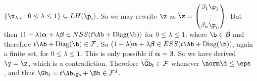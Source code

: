 \documentclass[moor]{informs3}              %
\begin{document}
$\{\x_{\lambda,i}:0\le\lambda\le1\}\subseteq LH(\p_i)$. So we may rewrite $\z$ as $\z=\renewcommand*{\arraystretch}{.5}\begin{pmatrix}\beta_1\p_1 \\ \vdots \\ \beta_n\p_n \end{pmatrix}$.
But then $(1-\lambda)\bm{\alpha}+\lambda\bm{\beta}\in NSS(t\Ab+\textup{Diag}(\b))$ for $0\le\lambda\le1$, where $\b\in\mathcal{\bar B}$ and therefore $t\Ab+\textup{Diag}(\b)\in\mathcal{F}$.
So $(1-\lambda)\bm{\alpha}+\lambda\bm{\beta}\in ESS(t\Ab+\textup{Diag}(\b))$, again a finite set, for $0\le\lambda\le1$. This is only possible if $\bm{\alpha}=\bm{\beta}$. So we have derived $\y=\z$, which is a contradiction.
Therefore $\bar\Gb_t\in\mathcal{F}$ whenever $\norm\d\le\eps$, and thus $\Gb_t=t\Ab_\Qb+\Bb\in\mathcal{F}^d$.
\end{document}
